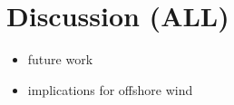 \documentclass{article}
\begin{document}
\clearpage

\section{Discussion (ALL)}
\label{sec:discussion}

\begin{itemize}
    \item future work
    \item implications for offshore wind
\end{itemize}

\clearpage








\end{document}
